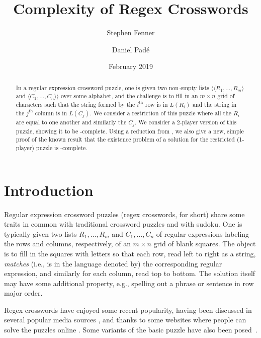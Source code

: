 \documentclass{article}
\newcommand{\0}{\mathbf{0}}
\newcommand{\1}{\mathbf{1}}
\newcommand{\2}{\mathbf{2}}
\newcommand{\tup}[1]{\langle{} #1 \rangle{}}
\newcounter{row}
\newcounter{col}
\theoremstyle{plain}
\theoremstyle{definition}
\begin{document}
\title{Complexity of Regex Crosswords}
\author{%
  Stephen Fenner \and Daniel Pad\'e%
}
\date{February 2019}

\maketitle
\begin{abstract}
  In a regular expression crossword puzzle, one is given two non-empty lists $\tup{\tup{R_1,\ldots, R_m}$ and $\tup{C_1, \ldots, C_n}}$ over some alphabet, and the challenge is to fill in an $m\times n$ grid of characters such that the string formed by the $i^\text{th}$ row is in $L(R_i)$ and the string in the $j^\text{th}$ column is in $L(C_j)$. We consider a restriction of this puzzle where all the $R_i$ are equal to one another and similarly the $C_j$.   We consider a 2-player version of this puzzle, showing it to be -complete.  Using a reduction from , we also give a new, simple proof of the known result that the existence problem of a solution for the restricted (1-player) puzzle is -complete. %
\end{abstract}

\section{Introduction}

Regular expression crossword puzzles (regex crosswords, for short) share some traits in common with traditional crossword puzzles and with sudoku.  One is typically given two lists $R_1,\ldots,R_m$ and $C_1,\ldots,C_n$ of regular expressions labeling the rows and columns, respectively, of an $m\times n$ grid of blank squares.  The object is to fill in the squares with letters so that each row, read left to right as a string, \emph{matches} (i.e., is in the language denoted by) the corresponding regular expression, and similarly for each column, read top to bottom.  The solution itself may have some additional property, e.g., spelling out a phrase or sentence in row major order.

Regex crosswords have enjoyed some recent popularity, having been discussed in several popular media sources \cite{mikejuk:regex-crossword,Black:regex-crossword}, and thanks to some websites where people can solve the puzzles online \cite{rc,rcs}. Some variants of the basic puzzle have also been posed~\cite{MIT-Mystery-Hunt}.
\end{document}
